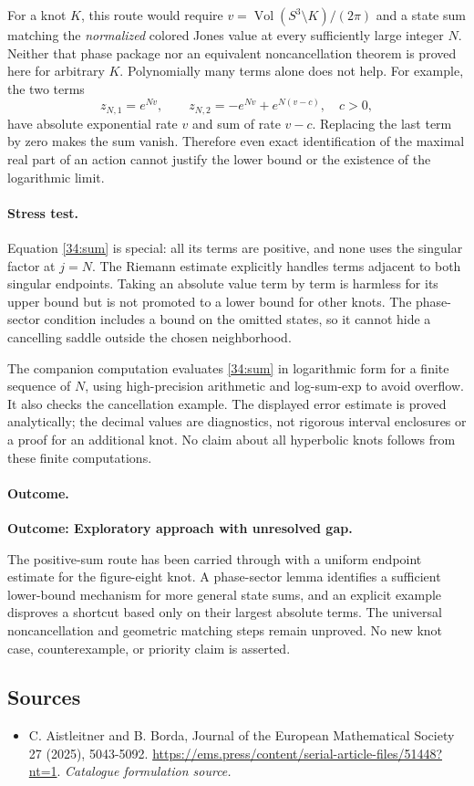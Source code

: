 \documentclass[11pt,a4paper]{article}
\numberwithin{equation}{section}
\begin{document}
For a knot $K$, this route would require $v=\operatorname{Vol}(S^3
\setminus K)/(2\pi)$ and a state sum matching the \emph{normalized}
colored Jones value at every sufficiently large integer $N$.  Neither
that phase package nor an equivalent noncancellation theorem is proved
here for arbitrary $K$.  Polynomially many terms alone does not help.
For example, the two terms
\[
 z_{N,1}=e^{Nv},\qquad z_{N,2}=-e^{Nv}+e^{N(v-c)},\quad c>0,
\]
have absolute exponential rate $v$ and sum of rate $v-c$.
Replacing the last term by zero makes the sum vanish.  Therefore even
exact identification of the maximal real part of an action cannot
justify the lower bound or the existence of the logarithmic limit.

\paragraph{Stress test.}
Equation \eqref{34:sum} is special: all its terms are positive, and none
uses the singular factor at $j=N$.  The Riemann estimate explicitly
handles terms adjacent to both singular endpoints.  Taking an absolute
value term by term is harmless for its upper bound but is not promoted
to a lower bound for other knots.  The phase-sector condition includes
a bound on the omitted states, so it cannot hide a cancelling saddle
outside the chosen neighborhood.

The companion computation evaluates \eqref{34:sum} in logarithmic
form for a finite sequence of $N$, using high-precision arithmetic and
log-sum-exp to avoid overflow.  It also checks the cancellation example.
The displayed error estimate is proved analytically; the decimal
values are diagnostics, not rigorous interval enclosures or a proof
for an additional knot.  No claim about all hyperbolic knots follows
from these finite computations.

\paragraph{Outcome.}
\textbf{Outcome: Exploratory approach with unresolved gap.}

The positive-sum route has been carried through with a uniform endpoint
estimate for the figure-eight knot.  A phase-sector lemma identifies a
sufficient lower-bound mechanism for more general state sums, and an
explicit example disproves a shortcut based only on their largest
absolute terms.  The universal noncancellation and geometric matching
steps remain unproved.  No new knot case, counterexample, or priority
claim is asserted.
\subsection{Sources}
\begin{itemize}\raggedright
\item[\textnormal{[S1]}]\hypertarget{source:34:1}{} C. Aistleitner and B. Borda, Journal of the European Mathematical Society 27 (2025), 5043-5092.
\url{https://ems.press/content/serial-article-files/51448?nt=1}.
{\small\textit{Catalogue formulation source.}}
\end{itemize}
\end{document}
